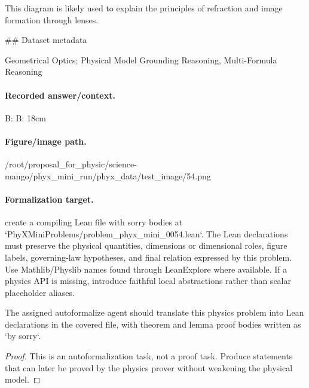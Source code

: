 This diagram is likely used to explain the principles of refraction and image formation through lenses.

\#\# Dataset metadata

Geometrical Optics; Physical Model Grounding Reasoning, Multi-Formula Reasoning

\paragraph{Recorded answer/context.}
B: B: 18cm

\paragraph{Figure/image path.}
/root/proposal\_for\_physic/science-mango/phyx\_mini\_run/phyx\_data/test\_image/54.png

\paragraph{Formalization target.}
create a compiling Lean file with sorry bodies at `PhyXMiniProblems/problem\_phyx\_mini\_0054.lean`. The Lean declarations must preserve the physical quantities, dimensions or dimensional roles, figure labels, governing-law hypotheses, and final relation expressed by this problem.
Use Mathlib/Physlib names found through LeanExplore where available. If a physics API is missing, introduce faithful local abstractions rather than scalar placeholder aliases.

\begin{theorem}
\label{thm:physics:phyx_mini_0054:target}
The assigned autoformalize agent should translate this physics problem into Lean declarations in the covered file, with theorem and lemma proof bodies written as `by sorry`.
\end{theorem}
\begin{proof}
This is an autoformalization task, not a proof task. Produce statements that can later be proved by the physics prover without weakening the physical model.
\end{proof}

